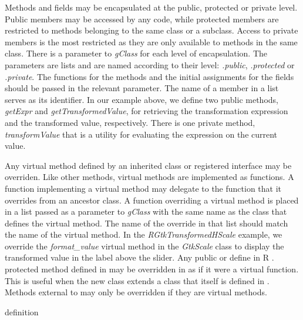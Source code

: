 \documentclass[article]{jss}
\begin{document}
Methods and fields may be encapsulated at the public, protected or
private level.  Public members may be accessed by any code, while
protected members are restricted to methods belonging to the same
class or a subclass. Access to private members is the most restricted
as they are only available to methods in the same class. There is a
parameter to \emph{gClass} for each level of encapsulation. The parameters are lists and are named according to
their level: \emph{.public}, \emph{.protected} or \emph{.private}.
The functions for the methods and the initial assignments for the
fields should be passed in the relevant parameter. The name of a member in a list serves as its
identifier. In our example above, we define two public methods,
\emph{getExpr} and \emph{getTransformedValue}, for retrieving the
transformation expression and the transformed value,
respectively. There is one private method, \emph{transformValue} that
is a utility for evaluating the expression on the current value.

Any virtual method defined by an inherited class or registered
interface may be overriden. Like other methods, virtual methods are implemented as  functions. A function implementing a virtual method may delegate to the function that it overrides from an ancestor class.
A function overriding a virtual method is 
placed in a list passed as a parameter to \emph{gClass} with the same name as the class that defines the virtual 
method. The name of the override in that list should match the name
of the virtual method. In the \emph{RGtkTransformedHScale} example, we override the \emph{format\_value} virtual method
in the \emph{GtkScale} class to display the
transformed value in the label above the slider.  Any public or 
define in R .
protected method defined in  may be overridden in 
 as if it were a virtual function. This is useful when the new class extends a class that itself is defined in . Methods external to  may only be overridden if they are virtual methods.

definition

\end{document}
